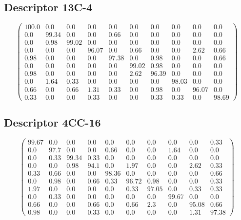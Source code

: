 \begin{appendices}
\subsection{Descriptor 13C-4}
$$\begin{pmatrix}
100.0&0.0&0.0&0.0&0.0&0.0&0.0&0.0&0.0&0.0\\
0.0&99.34&0.0&0.0&0.66&0.0&0.0&0.0&0.0&0.0\\
0.0&0.98&99.02&0.0&0.0&0.0&0.0&0.0&0.0&0.0\\
0.0&0.0&0.0&96.07&0.0&0.66&0.0&0.0&2.62&0.66\\
0.98&0.0&0.0&0.0&97.38&0.0&0.98&0.0&0.0&0.66\\
0.0&0.0&0.0&0.0&0.0&99.02&0.98&0.0&0.0&0.0\\
0.98&0.0&0.0&0.0&0.0&2.62&96.39&0.0&0.0&0.0\\
0.0&1.64&0.33&0.0&0.0&0.0&0.0&98.03&0.0&0.0\\
0.66&0.0&0.66&1.31&0.33&0.0&0.98&0.0&96.07&0.0\\
0.33&0.0&0.0&0.33&0.0&0.0&0.33&0.33&0.0&98.69
\end{pmatrix}$$

\subsection{Descriptor 4CC-16}
$$\begin{pmatrix}
99.67&0.0&0.0&0.0&0.0&0.0&0.0&0.0&0.0&0.33\\
0.0&97.7&0.0&0.0&0.66&0.0&0.0&1.64&0.0&0.0\\
0.0&0.33&99.34&0.33&0.0&0.0&0.0&0.0&0.0&0.0\\
0.0&0.0&0.98&94.1&0.0&1.97&0.0&0.0&2.62&0.33\\
0.33&0.66&0.0&0.0&98.36&0.0&0.0&0.0&0.0&0.66\\
0.0&0.98&0.0&0.66&0.33&96.72&0.98&0.0&0.0&0.33\\
1.97&0.0&0.0&0.0&0.0&0.33&97.05&0.0&0.33&0.33\\
0.0&0.33&0.0&0.0&0.0&0.0&0.0&99.67&0.0&0.0\\
0.66&0.0&0.0&0.66&0.0&0.66&2.3&0.0&95.08&0.66\\
0.98&0.0&0.0&0.33&0.0&0.0&0.0&0.0&1.31&97.38
\end{pmatrix}$$


\end{appendices}
